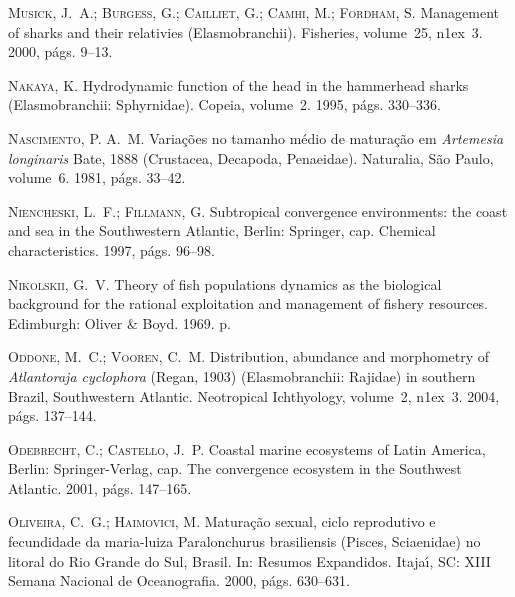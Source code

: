 \documentclass[a4paper,11pt,twoside,showtrims,onecolumn,openright,final]{memoir}
\begin{document}
\begin{thebibliography}{194}
\textsc{Musick, J.~A.; Burgess, G.; Cailliet, G.; Camhi, M.; Fordham, S.}
\newblock Management of sharks and their relativies ({E}lasmobranchii).
\newblock Fisheries, volume~25, n\raise1ex\hbox{}~3.
  2000{}, p\'ags. 9--13.

\textsc{Nakaya, K.}
\newblock Hydrodynamic function of the head in the hammerhead sharks
  ({E}lasmobranchii: {S}phyrnidae).
\newblock Copeia, volume~2. 1995, p\'ags. 330--336.

\textsc{Nascimento, P. A.~M.}
\newblock Varia\c{c}\~oes no tamanho m\'edio de matura\c{c}\~ao em \emph{{A}rtemesia
  longinaris} {B}ate, 1888 ({C}rustacea, {D}ecapoda, {P}enaeidae).
\newblock Naturalia, S\~ao Paulo, volume~6. 1981, p\'ags. 33--42.

\textsc{Niencheski, L.~F.; Fillmann, G.}
\newblock Subtropical convergence environments: the coast and sea in the
  {S}outhwestern {A}tlantic, Berlin: Springer, cap. Chemical characteristics.
  1997, p\'ags. 96--98.

\textsc{Nikolskii, G.~V.}
\newblock Theory of fish populations dynamics as the biological background for
  the rational exploitation and management of fishery resources.
\newblock Edimburgh: Oliver \& Boyd. 1969.
 p.

\textsc{Oddone, M.~C.; Vooren, C.~M.}
\newblock Distribution, abundance and morphometry of \emph{{A}tlantoraja cyclophora}
  ({R}egan, 1903) ({E}lasmobranchii: {R}ajidae) in southern {B}razil,
  {S}outhwestern {A}tlantic.
\newblock Neotropical Ichthyology, volume~2,
  n\raise1ex\hbox{}~3. 2004, p\'ags. 137--144.

\textsc{Odebrecht, C.; Castello, J.~P.}
\newblock Coastal marine ecosystems of {L}atin {A}merica, Berlin:
  Springer-Verlag, cap. The convergence ecosystem in the Southwest Atlantic.
  2001, p\'ags. 147--165.

\textsc{Oliveira, C.~G.; Haimovici, M.}
\newblock Matura\c{c}\~ao sexual, ciclo reprodutivo e fecundidade da
  maria-luiza {P}aralonchurus brasiliensis ({P}isces, {S}ciaenidae) no litoral
  do {R}io {G}rande do {S}ul, {B}rasil.
\newblock In: Resumos {E}xpandidos. Itaja\'{\i}, SC: XIII Semana Nacional de
  Oceanografia. 2000, p\'ags. 630--631.


\end{thebibliography}
\end{document}
